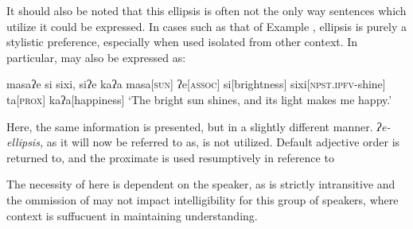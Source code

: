 It should also be noted that this ellipsis is often not the only way sentences which utilize it could be expressed. In cases such as that of Example , ellipsis is purely a stylistic preference, especially when used isolated from other context. In particular,  may also be expressed as:

\ex
\begingl
\glpreamble masaʔe si sixi, siʔe kaʔa
\endpreamble
\nogloss{\lbrack}
masa[\textsc{sun}]
ʔe[\textsc{assoc}]
si[brightness]
\nogloss{\rbrack}
sixi[\textsc{npst.ipfv}-shine]
ta[\textsc{prox}]
kaʔa[happiness]
\glft `The bright sun shines, and its light makes me happy.'
\endgl
\xe

Here, the same information is presented, but in a slightly different manner. \textit{ʔe-ellipsis,} as it will now be referred to as, is not utilized. Default adjective order is returned to, and the proximate  is used resumptively in reference to 

The necessity of  here is dependent on the speaker, as  is strictly intransitive and the ommission of  may not impact intelligibility for this group of speakers, where context is suffucuent in maintaining understanding.
